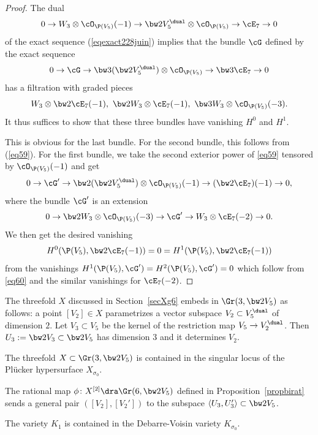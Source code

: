 \begin{proof}
The dual
\begin{equation}\label{eq59}
0\to W_3\otimes \cO_{\P(V_5)}(-1)\to \bw2V_5^\dual\otimes \cO_{\P(V_5)}\to \cE_7\to0
\end{equation}
of the exact sequence
(\ref{eqexact228juin}) implies that the bundle $\cG$ defined by
the exact sequence
\[
0\to\cG\to \bw3(\bw2V_5^\dual)\otimes \cO_{\P(V_5)}\to \bw3\cE_7\to 0
\]
has a filtration with graded pieces
\[
W_3\otimes \bw2\cE_7(-1),\ \bw2W_3\otimes \cE_7(-1),\ \bw3W_3\otimes \cO_{\P(V_5)}(-3).
\]
It thus suffices to show that these three bundles have vanishing
$H^0$ and $H^1$.

This is obvious for the last bundle. For the second bundle, this follows from (\ref{eq59}).
For the first bundle, we take the second exterior power of
\eqref{eq59} tensored by
$ \cO_{\P(V_5)}(-1)$ and get
\[
0\to\cG'\to \bw2(\bw2V_5^\dual)\otimes \cO_{\P(V_5)}(-1)\to ( \bw2\cE_7)(-1)\to 0,
\]
where the bundle
$\cG'$ is an extension
\begin{equation}\label{eq60}
0\to \bw2W_3\otimes \cO_{\P(V_5)}(-3)\to\cG'\to
W_3\otimes \cE_7(-2)\to0.
\end{equation}
We then get the desired vanishing
\[
H^0(\P(V_5),\bw2\cE_7(-1))=0=H^1(\P(V_5),\bw2\cE_7(-1))
\]
from
the vanishings $H^1(\P(V_5),\cG')=H^2(\P(V_5),\cG')=0$ which follow from
\eqref{eq60} and the similar vanishings for $\cE_7(-2)$.
\end{proof}

The threefold $X$ discussed in Section~\ref{secXg6} embeds
in $\Gr(3,\bw2V_5)$ as follows:
a point $[V_2]\in X$ parametrizes a vector subspace $V_2\subset V_5^\dual$ of dimension
$2$. Let $V_3\subset V_5$ be the kernel of the restriction map
$V_5\to V_2^\dual$. Then
$U_3:=\bw2V_3\subset \bw2V_5$ has dimension $3$ and it determines $V_2$.

\skpt
\begin{prop}\label{lexsing}
\begin{enumeratea}
\item\label{lexsinga}
The threefold $X\subset \Gr(3,\bw2V_5)$ is contained
in the singular locus
of the Plücker hypersurface $X_{\sigma_0}$.

\item\label{lexsingb}
The rational map $\phi\colon X^{[2]}\dra \Gr(6,\bw2V_5)$ defined in Proposition~\ref{propbirat}
sends a general pair $([V_2],[V_2'])$ to the subspace
$\langle U_3,U'_3\rangle\subset \bw2V_5$.

\item\label{lexsingc}
The variety $K_1$ is contained in the Debarre-Voisin variety $K_{\sigma_0}$.
\end{enumeratea}
\end{prop}

